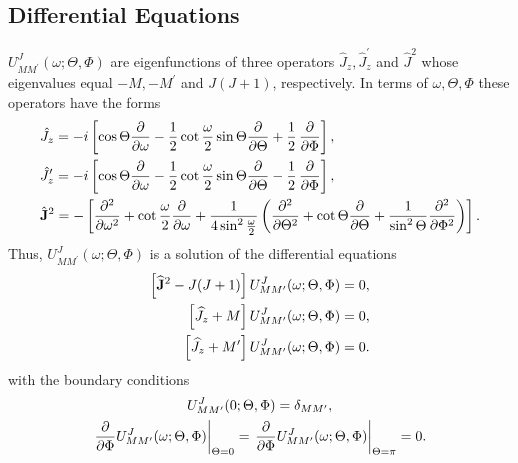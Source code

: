 \subsection{Differential Equations}\label{sec:4.5.3}
$U_{M M^{\prime}}^{J}(\omega ; \Theta, \Phi)$ are eigenfunctions of three operators $\widehat{J}_{z}, \widehat{J}_{z}^{\prime}$ and $\widehat{J}^{2}$ whose eigenvalues equal $-M,-M^{\prime}$ and $J(J+1)$, respectively. In terms of $\omega, \Theta, \Phi$ these operators have the forms
\begin{align}
& \hat{J}_{z}=-i\left[\cos \Theta \frac{\partial}{\partial \omega}-\frac{1}{2} \cot \frac{\omega}{2} \sin \Theta \frac{\partial}{\partial \Theta}+\frac{1}{2} \, \frac{\partial}{\partial \Phi}\right] , \label{eq:4:5:9}\\
& \hat{J}_{z}^{\prime}=-i\left[\cos \Theta \frac{\partial}{\partial \omega}-\frac{1}{2} \cot \frac{\omega}{2} \sin \Theta \frac{\partial}{\partial \Theta}-\frac{1}{2} \, \frac{\partial}{\partial \Phi}\right] , \label{eq:4:5:10}\\
& \hat{\mathbf{J}}^{2}=-\left[\frac{\partial^{2}}{\partial \omega^{2}}+\cot \frac{\omega}{2} \frac{\partial}{\partial \omega}+\frac{1}{4 \sin ^{2} \frac{\omega}{2}}\left(\frac{\partial^{2}}{\partial \Theta^{2}}+\cot \Theta \frac{\partial}{\partial \Theta}+\frac{1}{\sin ^{2} \Theta} \frac{\partial^{2}}{\partial \Phi^{2}}\right)\right] .\label{eq:4:5:11}
\end{align}
Thus, $U_{M M^{\prime}}^{J}(\omega ; \Theta, \Phi)$ is a solution of the differential equations
\begin{align}
{\left[\widehat{\mathbf{J}}^{2}-J(J+1)\right] U_{M M^{\prime}}^{J}(\omega ; \Theta, \Phi) } & =0 , \notag\\
{\left[\widehat{J}_{z}+M\right] U_{M M^{\prime}}^{J}(\omega ; \Theta, \Phi) } & =0  ,\label{eq:4:5:12}\\
{\left[\widehat{J}_{z}+M^{\prime}\right] U_{M M^{\prime}}^{J}(\omega ; \Theta, \Phi) } & =0 .\notag
\end{align}
with the boundary conditions
\begin{gather}
U_{M M^{\prime}}^{J}(0 ; \Theta, \Phi)=\delta_{M M^{\prime}},  \notag\\
\left.\frac{\partial}{\partial \Phi} U_{M M^{\prime}}^{J}(\omega ; \Theta, \Phi)\right|_{\Theta=0}=\left.\frac{\partial}{\partial \Phi} U_{M M^{\prime}}^{J}(\omega ; \Theta, \Phi)\right|_{\Theta=\pi}=0 . \label{eq:4:5:13}
\end{gather}
